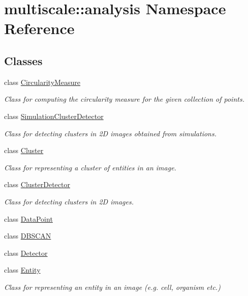 \hypertarget{namespacemultiscale_1_1analysis}{\section{multiscale\-:\-:analysis Namespace Reference}
\label{namespacemultiscale_1_1analysis}
}
\subsection*{Classes}
\begin{DoxyCompactItemize}
\item 
class \hyperlink{classmultiscale_1_1analysis_1_1CircularityMeasure}{Circularity\-Measure}
\begin{DoxyCompactList}\small\item\em Class for computing the circularity measure for the given collection of points. \end{DoxyCompactList}\item 
class \hyperlink{classmultiscale_1_1analysis_1_1SimulationClusterDetector}{Simulation\-Cluster\-Detector}
\begin{DoxyCompactList}\small\item\em Class for detecting clusters in 2\-D images obtained from simulations. \end{DoxyCompactList}\item 
class \hyperlink{classmultiscale_1_1analysis_1_1Cluster}{Cluster}
\begin{DoxyCompactList}\small\item\em Class for representing a cluster of entities in an image. \end{DoxyCompactList}\item 
class \hyperlink{classmultiscale_1_1analysis_1_1ClusterDetector}{Cluster\-Detector}
\begin{DoxyCompactList}\small\item\em Class for detecting clusters in 2\-D images. \end{DoxyCompactList}\item 
class \hyperlink{classmultiscale_1_1analysis_1_1DataPoint}{Data\-Point}
\item 
class \hyperlink{classmultiscale_1_1analysis_1_1DBSCAN}{D\-B\-S\-C\-A\-N}
\item 
class \hyperlink{classmultiscale_1_1analysis_1_1Detector}{Detector}
\item 
class \hyperlink{classmultiscale_1_1analysis_1_1Entity}{Entity}
\begin{DoxyCompactList}\small\item\em Class for representing an entity in an image (e.\-g. cell, organism etc.) \end{DoxyCompactList}\item 

\end{DoxyCompactItemize}
